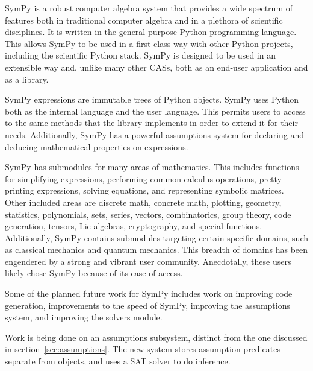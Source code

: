 SymPy is a robust computer algebra system that provides a wide spectrum of
features both in traditional computer algebra and in a plethora of scientific
disciplines. It is written in the general purpose Python programming language.
This allows SymPy to be used in a first-class way with other Python projects,
including the scientific Python stack. SymPy is designed to be used in an
extensible way and, unlike many other CASs, both as an end-user application and
as a library.

SymPy expressions are immutable trees of Python objects. SymPy uses Python both
as the internal language and the user language. This permits users to access to
the same
methods that the library implements in order to extend it for their needs.
Additionally, SymPy has a powerful assumptions
system for declaring and deducing mathematical properties on expressions.

SymPy has submodules for many areas of mathematics. This includes functions for
simplifying expressions, performing common calculus operations, pretty printing
expressions, solving equations, and representing symbolic matrices. Other included
areas
are discrete math, concrete math, plotting, geometry, statistics,
polynomials, sets, series, vectors, combinatorics, group theory, code
generation, tensors, Lie algebras, cryptography, and special functions.
Additionally, SymPy contains submodules targeting certain specific domains,
such as classical mechanics and quantum mechanics.  This breadth of domains has
been engendered by a strong and vibrant user community.
Anecdotally, these users likely chose SymPy because of its ease of access.


Some of the planned future work for SymPy includes work on improving code
generation, improvements to the speed of SymPy, improving the assumptions
system, and improving the solvers module.


Work is being done on an assumptions subsystem, distinct from the one
discussed in section~\ref{sec:assumptions}. The new system stores assumption
predicates separate from objects, and uses a SAT solver to do inference.



